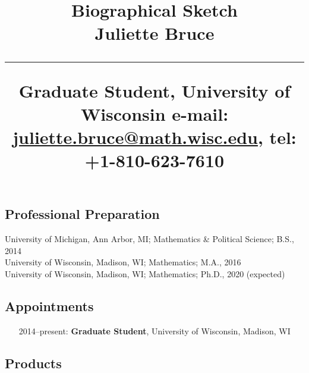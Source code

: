 \documentclass[svgnames,11pt]{article}
\title{%
        \vspace{-2\baselineskip}
            \normalsize
            Biographical Sketch\\
            {\large\textbf{Juliette Bruce }}\\
            \vspace{0.5\baselineskip}
            \hrule
            \vspace{0.5\baselineskip}
            Graduate Student, University of Wisconsin
            e-mail: \href{mailto:juliette.bruce@math.wisc.edu}{juliette.bruce@math.wisc.edu},
            tel: +1-810-623-7610
        \vspace{-1.5ex}
        }
\date{}
\author{}
\begin{document}
\maketitle
\vspace{-4\baselineskip}

\subsection{Professional Preparation}

    University of Michigan, Ann Arbor, MI;
        Mathematics \& Political Science;
        B.S., 2014
        \\
    University of Wisconsin, Madison, WI;
        Mathematics;
        M.A., 2016
        \\
     University of Wisconsin, Madison, WI;
        Mathematics;
        Ph.D., 2020 (expected)
 
\subsection{Appointments}

\begin{itemize}[label={--9999:},leftmargin=*,itemsep=0pt]
%
    \item[2014--present:]
        \textbf{Graduate Student},
        University of Wisconsin,
        Madison, WI
%
%
%
%
%
%
\end{itemize}

\subsection{Products}
\end{document}
